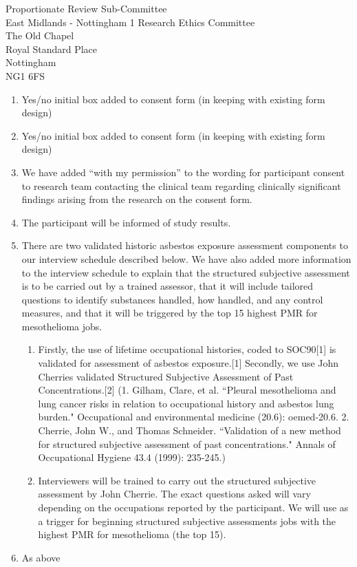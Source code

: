 \documentclass[imperial,letterpaper,pagesize,UScommercial9]{scrlttr2}
\begin{document}
\begin{letter}{    
    Proportionate Review Sub-Committee \\        
    East Midlands - Nottingham 1 Research Ethics Committee \\
    The Old Chapel \\
    Royal Standard Place \\
    Nottingham \\
    NG1 6FS}
\begin{enumerate}[]
\begin{enumerate}[label=(\alph*)]
            \item Patient Liaison and Advisory Services (PALS) contact details are included.
        \end{enumerate}
        \item Yes/no initial box added to consent form (in keeping with existing form design)
        \item Yes/no initial box added to consent form (in keeping with existing form design)
        \item We have added ``with my permission'' to the wording for participant consent to research team contacting the clinical team regarding clinically significant findings arising from the research on the consent form.
        \item The participant will be informed of study results.
        \item There are two validated historic asbestos exposure assessment components to our interview schedule described below. We have also added more information to the interview schedule to explain that the structured subjective assessment is to be carried out by a trained assessor, that it will include tailored questions to identify substances handled, how handled, and any control measures, and that it will be triggered by the top 15 highest PMR for mesothelioma jobs.
            \begin{enumerate}
                \item Firstly, the use of lifetime occupational histories, coded to SOC90[1] is validated for assessment of asbestos exposure.[1] Secondly, we use John Cherries validated Structured Subjective Assessment of Past Concentrations.[2] (1. Gilham, Clare, et al. ``Pleural mesothelioma and lung cancer risks in relation to occupational history and asbestos lung burden." Occupational and environmental medicine
                    (20.6): oemed-20.6. 2. Cherrie, John W., and Thomas Schneider. ``Validation of a new method for structured subjective assessment of past concentrations." Annals of Occupational Hygiene 43.4 (1999): 235-245.)
                \item Interviewers will be trained to carry out the structured subjective assessment by John Cherrie. The exact questions asked will vary depending on the occupations reported by the participant. We will use as a trigger for beginning structured subjective assessments jobs with the highest PMR for mesothelioma (the top 15).
            \end{enumerate}
        \item As above

\end{enumerate}
\end{letter}
\end{document}
